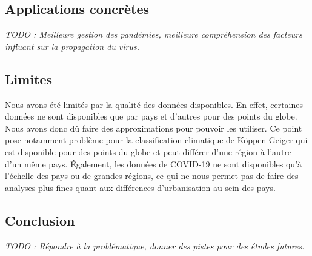 \documentclass[12pt]{iEEEtran}
\begin{document}
\subsection{Applications concrètes}
\textit{TODO : Meilleure gestion des pandémies, meilleure compréhension des facteurs
influant sur la propagation du virus.}
\subsection{Limites}
Nous avons été limités par la qualité des données disponibles. En effet, certaines données
ne sont disponibles que par pays et d'autres pour des points du globe. Nous avons donc dû
faire des approximations pour pouvoir les utiliser. Ce point pose notamment problème pour
la classification climatique de Köppen-Geiger qui est disponible pour des points du globe et
peut différer d'une région à l'autre d'un même pays. Également, les données de COVID-19
ne sont disponibles qu'à l'échelle des pays ou de grandes régions, ce qui ne nous permet
pas de faire des analyses plus fines quant aux différences d'urbanisation au sein des pays.

\subsection{Conclusion}
\textit{TODO : Répondre à la problématique, donner des pistes pour des études futures.}




\newpage
\end{document}
